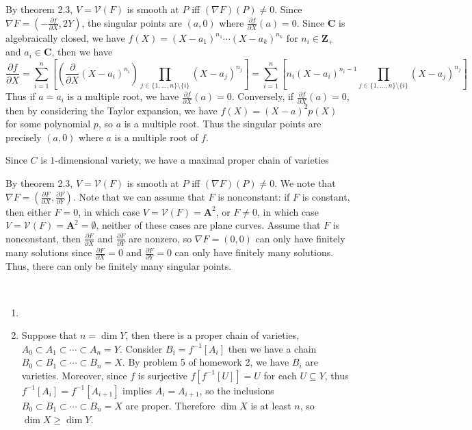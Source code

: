\documentclass[11pt]{book}
\begin{document}
\begin{problem}By theorem 2.3, $V=\mathcal{V}(F)$ is smooth at $P$ iff $(\nabla F)(P)\ne 0$. Since $\nabla F=(-\frac{\partial f}{\partial X},2Y)$, the singular points are $(a,0)$ where $\frac{\partial f}{\partial X}(a)=0$. Since $\mathbf C$ is algebraically closed, we have $f(X)=(X-a_1)^{n_1}\cdots (X-a_k)^{n_k}$ for $n_i\in\mathbf Z_{+}$ and $a_i\in\mathbf C$, then we have 
\[\frac{\partial f}{\partial X}=\sum_{i=1}^n\left[\left(\frac{\partial}{\partial X}(X-a_i)^{n_i}\right)\prod_{j\in \{1,\dots,n\}\setminus \{i\}}(X-a_j)^{n_j}\right]=\sum_{i=1}^n\left[n_i(X-a_i)^{n_i-1}\prod_{j\in \{1,\dots,n\}\setminus \{i\}}(X-a_j)^{n_j}\right]\]
Thus if $a=a_i$ is a multiple root, we have $\frac{\partial f}{\partial X}(a)=0$. Conversely, if $\frac{\partial f}{\partial X}(a)=0$, then by considering the Taylor expansion, we have $f(X)=(X-a)^2p(X)$ for some polynomial $p$, so $a$ is a multiple root. Thus the singular points are precisely $(a,0)$ where $a$ is a multiple root of $f$.
\end{problem}
\begin{problem}Since $C$ is $1$-dimensional variety, we have a maximal proper chain of varieties 

\end{problem}
\begin{problem}
By theorem 2.3, $V=\mathcal{V}(F)$ is smooth at $P$ iff $(\nabla F)(P)\ne 0$. We note that $\nabla F=(\frac{\partial F}{\partial X}, \frac{\partial F}{\partial Y})$. Note that we can assume that $F$ is nonconstant: if $F$ is constant, then either $F=0$, in which case $V=\mathcal{V}(F)=\mathbf A^2$, or $F\ne 0$, in which case $V=\mathcal{V}(F)=\mathbf A^2=\emptyset$, neither of these cases are plane curves. Assume that $F$ is nonconstant, then $\frac{\partial F}{\partial X}$ and $\frac{\partial F}{\partial Y}$ are nonzero, so $\nabla F=(0,0)$ can only have finitely many solutions since $\frac{\partial F}{\partial X}=0$ and $\frac{\partial F}{\partial Y}=0$ can only have finitely many solutions. Thus, there can only be finitely many singular points.
\end{problem}
\begin{problem}~\\[-1em]
\begin{enumerate}[label=(\alph*)]
	\item 
	\item Suppose that $n=\dim Y$, then there is a proper chain of varieties, $A_0\subset A_1\subset\cdots\subset A_n=Y$. Consider $B_i=f^{-1}[A_i]$ then we have a chain $B_0\subset B_1\subset\cdots\subset B_n=X$. By problem 5 of homework 2, we have $B_i$ are varieties. Moreover, since $f$ is surjective $f[f^{-1}[U]]=U$ for each $U\subseteq Y$, thus $f^{-1}[A_i]= f^{-1}[A_{i+1}]$ implies $A_i=A_{i+1}$, so the inclusions $B_0\subset B_1\subset\cdots\subset B_n=X$ are proper. Therefore $\dim X$ is at least $n$, so $\dim X\ge \dim Y$.
\end{enumerate}
\end{problem}
\end{document}

